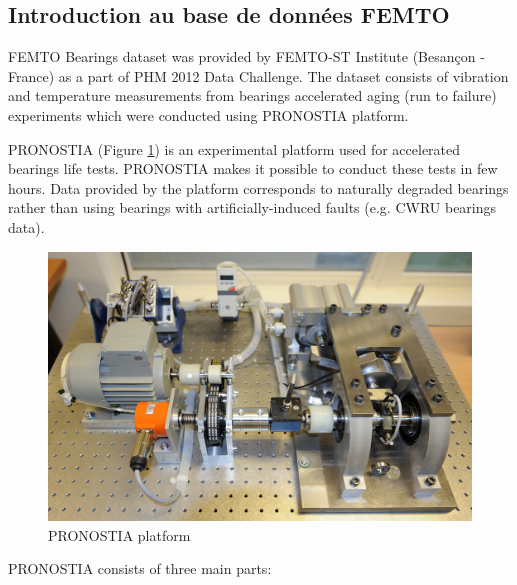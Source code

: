 \subsection{Introduction au base de données FEMTO}%
\label{sub:introduction_au_base_de_donnees_femto}

FEMTO Bearings dataset was provided by FEMTO-ST Institute (Besançon - France) as a part of PHM 2012 Data Challenge. The dataset consists of vibration and temperature measurements from bearings accelerated aging (run to failure) experiments which were conducted using PRONOSTIA platform.

PRONOSTIA (Figure \ref{fig:pronostia-platform}) is an experimental platform used for accelerated bearings life tests. PRONOSTIA makes it possible to conduct these tests in few hours. Data provided by the platform corresponds to naturally degraded bearings rather than using bearings with artificially-induced faults (e.g. CWRU bearings data).

\begin{figure}[h]
	\centering
	\includegraphics[width=.8\linewidth]{figures/pronostia.jpg}
	\caption{PRONOSTIA platform \cite{pronostia}}%
	\label{fig:pronostia-platform}
\end{figure}

PRONOSTIA consists of three main parts:

